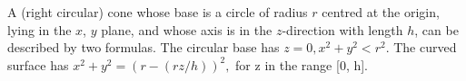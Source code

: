 A (right circular) cone whose base is a circle of radius $r$ centred
at the origin, lying in the $x$, $y$ plane, and whose axis is in the
$z$-direction with length $h$, can be described by two formulas. The
circular base has $z=0, x^2+y^2 < r^2.$ The curved surface has
$x^2+y^2=(r-(rz/h))^2,$ for z in the range [0, h].